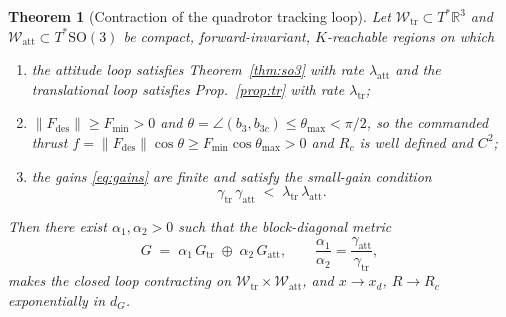 \documentclass[11pt,a4paper]{article}
\newcommand{\Rm}{\mathbb{R}}
\newcommand{\norm}[1]{\lVert #1 \rVert}
\newcommand{\SO}{\mathrm{SO}(3)}
\theoremstyle{plain}
\newtheorem{theorem}{Theorem}[section]
\theoremstyle{definition}
\theoremstyle{remark}
\begin{document}
\begin{theorem}[Contraction of the quadrotor tracking loop]
\label{thm:se3}
Let $\mathcal{W}_{\mathrm{tr}}\subset T^{*}\Rm^3$ and $\mathcal{W}_{\mathrm{att}}\subset T^{*}\SO$
be compact, forward-invariant, $K$-reachable regions on which
\begin{enumerate}[label=(H\arabic*),leftmargin=2.8em,itemsep=2pt,topsep=2pt]
\item \label{H1} the attitude loop satisfies Theorem~\ref{thm:so3} with rate
      $\lambda_{\mathrm{att}}$ and the translational loop satisfies
      Prop.~\ref{prop:tr} with rate $\lambda_{\mathrm{tr}}$;
\item \label{H2} $\norm{F_{\mathrm{des}}} \ge F_{\min} > 0$ and
      $\theta = \angle(b_3,b_{3c}) \le \theta_{\max} < \pi/2$, so the commanded
      thrust $f = \norm{F_{\mathrm{des}}}\cos\theta \ge F_{\min}\cos\theta_{\max} > 0$
      and $R_c$ is well defined and $C^2$;
\item \label{H3} the gains \eqref{eq:gains} are finite and satisfy the small-gain
      condition
      \begin{equation}
        \boxed{\;\;\gamma_{\mathrm{tr}}\,\gamma_{\mathrm{att}}
        \;<\; \lambda_{\mathrm{tr}}\,\lambda_{\mathrm{att}} .\;\;}
        \label{eq:smallgain}
      \end{equation}
\end{enumerate}
Then there exist $\alpha_1,\alpha_2>0$ such that the block-diagonal metric
\begin{equation}
  G \;=\; \alpha_1\,G_{\mathrm{tr}} \;\oplus\; \alpha_2\,G_{\mathrm{att}},
  \qquad
  \frac{\alpha_1}{\alpha_2} = \frac{\gamma_{\mathrm{att}}}{\gamma_{\mathrm{tr}}},
  \label{eq:se3-G}
\end{equation}
makes the closed loop contracting on
$\mathcal{W}_{\mathrm{tr}}\times\mathcal{W}_{\mathrm{att}}$, and $x\to x_d$,
$R\to R_c$ exponentially in $d_G$.
\end{theorem}
\end{document}

